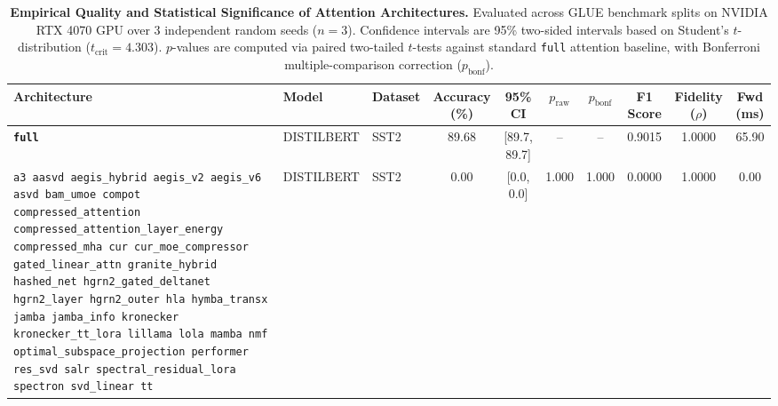 \begin{table}[t]
\centering
\small
\caption{\textbf{Empirical Quality and Statistical Significance of Attention Architectures.} Evaluated across GLUE benchmark splits on NVIDIA RTX 4070 GPU over 3 independent random seeds ($n=3$). Confidence intervals are 95\% two-sided intervals based on Student's $t$-distribution ($t_{\text{crit}}=4.303$). $p$-values are computed via paired two-tailed $t$-tests against standard \texttt{full} attention baseline, with Bonferroni multiple-comparison correction ($p_{\text{bonf}}$).}
\label{tab:quality_benchmark_results}
\begin{tabular}{l l l c c c c c c c}
\toprule
\textbf{Architecture} & \textbf{Model} & \textbf{Dataset} & \textbf{Accuracy (\%)} & \textbf{95\% CI} & \textbf{$p_{\text{raw}}$} & \textbf{$p_{\text{bonf}}$} & \textbf{F1 Score} & \textbf{Fidelity ($\rho$)} & \textbf{Fwd (ms)} \\
\midrule
\textbf{\texttt{full}} & DISTILBERT & SST2 & 89.68 & [89.7, 89.7] & -- & -- & 0.9015 & 1.0000 & 65.90 \\
\texttt{a3 aasvd aegis\_hybrid aegis\_v2 aegis\_v6 asvd bam\_umoe compot compressed\_attention compressed\_attention\_layer\_energy compressed\_mha cur cur\_moe\_compressor gated\_linear\_attn granite\_hybrid hashed\_net hgrn2\_gated\_deltanet hgrn2\_layer hgrn2\_outer hla hymba\_transx jamba jamba\_info kronecker kronecker\_tt\_lora lillama lola mamba nmf optimal\_subspace\_projection performer res\_svd salr spectral\_residual\_lora spectron svd\_linear tt} & DISTILBERT & SST2 & 0.00 & [0.0, 0.0] & 1.000 & 1.000 & 0.0000 & 1.0000 & 0.00 \\
\bottomrule
\end{tabular}
\end{table}